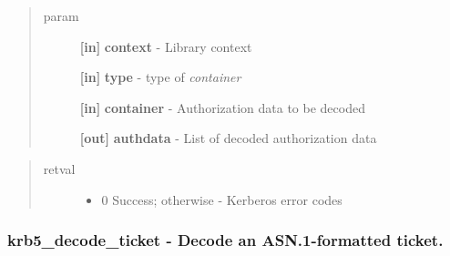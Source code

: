 \documentclass[letterpaper,10pt,english]{sphinxmanual}
\begin{document}
\begin{fulllineitems}
\label{appdev/refs/api/krb5_decode_authdata_container:c.krb5_decode_authdata_container}
\end{fulllineitems}

\begin{quote}\begin{description}
\item[{param}] \leavevmode
\textbf{{[}in{]}} \textbf{context} - Library context

\textbf{{[}in{]}} \textbf{type} -  type of \emph{container}

\textbf{{[}in{]}} \textbf{container} - Authorization data to be decoded

\textbf{{[}out{]}} \textbf{authdata} - List of decoded authorization data

\end{description}\end{quote}
\begin{quote}\begin{description}
\item[{retval}] \leavevmode\begin{itemize}
\item {} 
0   Success; otherwise - Kerberos error codes

\end{itemize}

\end{description}\end{quote}




{\hyperref[appdev/refs/api/krb5_encode_authdata_container:c.krb5_encode_authdata_container]{}}




\subsubsection{krb5\_decode\_ticket -  Decode an ASN.1-formatted ticket.}
\label{appdev/refs/api/krb5_decode_ticket::doc}\label{appdev/refs/api/krb5_decode_ticket:krb5-decode-ticket-decode-an-asn-1-formatted-ticket}
\end{document}
